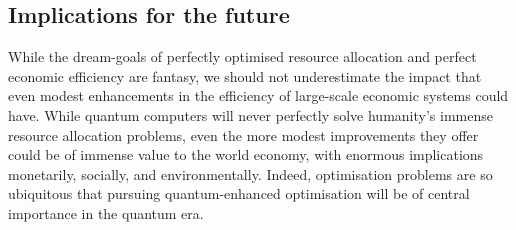 \subsection{Implications for the future}

While the dream-goals of perfectly optimised resource allocation and perfect economic efficiency are fantasy, we should not underestimate the impact that even modest enhancements in the efficiency of large-scale economic systems could have. While quantum computers will never perfectly solve humanity's immense resource allocation problems, even the more modest improvements they offer could be of immense value to the world economy, with enormous implications monetarily, socially, and environmentally. Indeed, optimisation problems are so ubiquitous that pursuing quantum-enhanced optimisation will be of central importance in the quantum era.